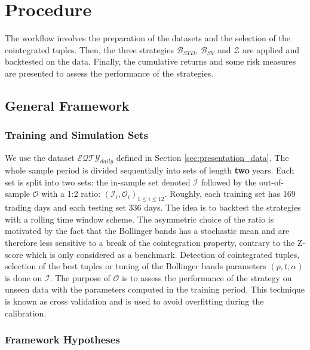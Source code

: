 \documentclass[11pt,a4,twosided,singlespacing,titlepagenumber=on]{scrreprt}
\numberwithin{equation}{chapter} %
\theoremstyle{remark}
\begin{document}
\chapter{Procedure}
The workflow involves the preparation of the datasets and the selection of the cointegrated tuples. Then, the three strategies $\mathcal{B}_{STD}$, $\mathcal{B}_{SV}$ and $\mathcal{Z}$ are applied and backtested on the data. Finally, the cumulative returns and some risk measures are presented to assess the performance of the strategies.

\section{General Framework}

\subsection{Training and Simulation Sets}
We use the dataset $\mathcal{EQTY}_{daily}$ defined in Section \ref{sec:presentation_data}. The whole sample period is divided sequentially into sets of length \textbf{two} years. Each set is split into two sets: the in-sample set denoted $\mathcal{I}$ followed by the out-of-sample $\mathcal{O}$ with a 1:2 ratio: $(\mathcal{I}_i, \mathcal{O}_i)_{1 \leq i \leq 12}$. Roughly, each training set has 169 trading days and each testing set 336 days. The idea is to backtest the strategies with a rolling time window scheme. The asymmetric choice of the ratio is motivated by the fact that the Bollinger bands has a stochastic mean and are therefore less sensitive to a break of the cointegration property, contrary to the Z-score which is only considered as a benchmark. Detection of cointegrated tuples, selection of the best tuples or tuning of the Bollinger bands parameters $(p,t,\alpha)$ is done on $\mathcal{I}$. The purpose of $\mathcal{O}$ is to assess the performance of the strategy on unseen data with the parameters computed in the training period. This technique is known as cross validation and is used to avoid overfitting during the calibration. 


\subsection{Framework Hypotheses}
\end{document}
